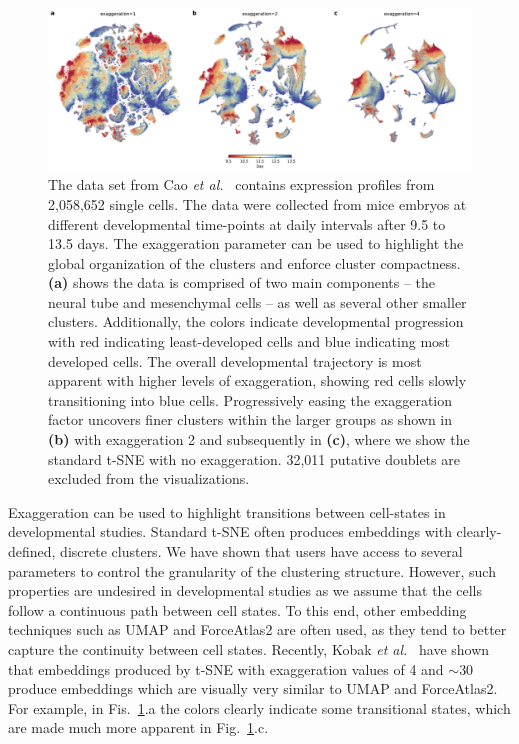 \documentclass[twocolumn]{bmcart}
\begin{document}
\begin{figure}[htbp]
  \includegraphics[width=\textwidth]{cao2019}
  \caption{\label{fig:cao}The data set from Cao \textit{et al.}~\cite{cao2019single} contains expression profiles from 2,058,652 single cells. The data were collected from mice embryos at different developmental time-points at daily intervals after 9.5 to 13.5 days. The exaggeration parameter can be used to highlight the global organization of the clusters and enforce cluster compactness. \textbf{(a)} shows the data is comprised of two main components -- the neural tube and mesenchymal cells -- as well as several other smaller clusters. Additionally, the colors indicate developmental progression with red indicating least-developed cells and blue indicating most developed cells. The overall developmental trajectory is most apparent with higher levels of exaggeration, showing red cells slowly transitioning into blue cells. Progressively easing the exaggeration factor uncovers finer clusters within the larger groups as shown in \textbf{(b)} with exaggeration 2 and subsequently in \textbf{(c)}, where we show the standard t-SNE with no exaggeration. 32,011 putative doublets are excluded from the visualizations.}
\end{figure}

Exaggeration can be used to highlight transitions between cell-states in developmental studies. Standard t-SNE often produces embeddings with clearly-defined, discrete clusters. We have shown that users have access to several parameters to control the granularity of the clustering structure. However, such properties are undesired in developmental studies as we assume that the cells follow a continuous path between cell states. To this end, other embedding techniques such as UMAP and ForceAtlas2 are often used, as they tend to better capture the continuity between cell states. Recently, Kobak \textit{et al.}~\cite{TODO} have shown that embeddings produced by t-SNE with exaggeration values of 4 and $\sim30$ produce embeddings which are visually very similar to UMAP and ForceAtlas2. For example, in Fis.~\ref{fig:cao}.a the colors clearly indicate some transitional states, which are made much more apparent in Fig.~\ref{fig:cao}.c.
\end{document}
